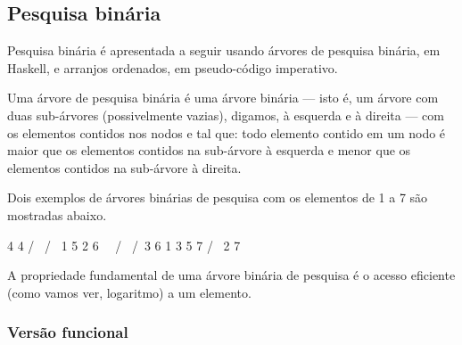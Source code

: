 \subsection{Pesquisa binária}
\label{pesquisa-binaria}

Pesquisa binária é apresentada a seguir usando árvores de pesquisa
binária, em Haskell, e arranjos ordenados, em pseudo-código
imperativo.

Uma árvore de pesquisa binária é uma árvore binária --- isto é, um
árvore com duas sub-árvores (possivelmente vazias), digamos, à
esquerda e à direita --- com os elementos contidos nos nodos e tal
que: todo elemento contido em um nodo é maior que os elementos
contidos na sub-árvore à esquerda e menor que os elementos contidos na
sub-árvore à direita.

Dois exemplos de árvores binárias de pesquisa com os elementos de 1 a
7 são mostradas abaixo. 

  4                    4
 / \                  / \
1   5                2   6
 \   \              / \  /\
 3    6            1  3 5  7 
/      \ 
2       7

A propriedade fundamental de uma árvore binária de pesquisa é o acesso
eficiente (como vamos ver, logaritmo) a um elemento.

\subsubsection{Versão funcional}





